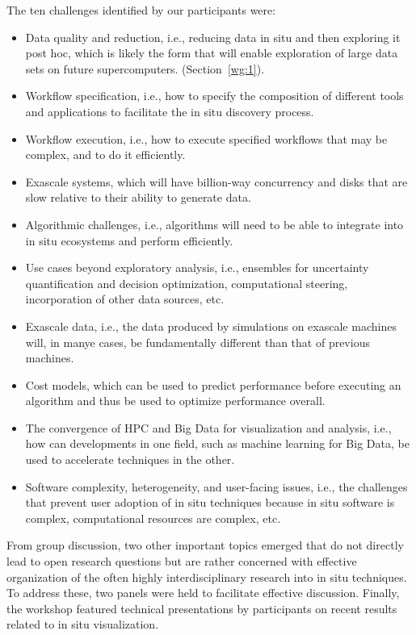 The ten challenges identified by our participants were:
\begin{itemize}
    \item Data quality and reduction, i.e., reducing data in situ and then exploring it post hoc, which is likely the form that will enable exploration of large data sets on future supercomputers.
    	(Section~\ref{wg:1}).
    \item Workflow specification, i.e., how to specify the composition of different tools and applications to facilitate the in situ discovery process.
    \item Workflow execution, i.e., how to execute specified workflows that may be complex, and to do it efficiently.
    \item Exascale systems, which will have billion-way concurrency and disks that are slow relative to their ability to generate data.
    \item Algorithmic challenges, i.e., algorithms will need to be able to integrate into in situ ecosystems and perform efficiently.
    \item Use cases beyond exploratory analysis, i.e., ensembles for uncertainty quantification and decision optimization, computational steering, incorporation of other data sources, etc.
    \item Exascale data, i.e., the data produced by simulations on exascale machines will, in manye cases, be fundamentally different than that of previous machines.
    \item Cost models, which can be used to predict performance before executing an algorithm and thus be used to optimize performance overall.
    \item The convergence of HPC and Big Data for visualization and analysis, i.e., how can developments in one field, such as machine learning for Big Data, be used to accelerate techniques in the other. 
    \item Software complexity, heterogeneity, and user-facing issues, i.e., the challenges that prevent user adoption of in situ techniques because in situ software is complex, computational resources are complex, etc.
\end{itemize}

\noindent
From group discussion, two other important topics emerged that do not directly lead to open research questions but are rather concerned with effective organization of the often highly interdisciplinary research into in situ techniques. To address these, two panels were held to facilitate effective discussion. Finally, the workshop featured technical presentations by participants on recent results related to in situ visualization.